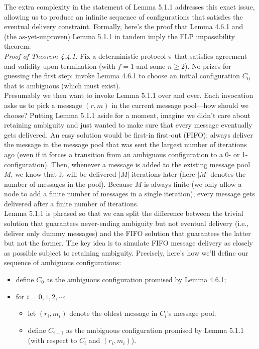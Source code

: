 The extra complexity in the statement of Lemma 5.1.1 addresses this exact issue, allowing
us to produce an infinite sequence of configurations that satisfies the eventual delivery constraint. Formally, here’s the proof that Lemma 4.6.1 and (the as-yet-unproven) Lemma 5.1.1 in tandem imply the FLP impossibility theorem:\\
\noindent
\textit{Proof of Theorem 4.4.1:} Fix a deterministic protocol $\pi$ that satisfies agreement and validity
upon termination (with $f = 1$ and some $n \geq 2$). No prizes for guessing the first step: invoke
Lemma 4.6.1 to choose an initial configuration $C_0$ that is ambiguous (which must exist).\\
Presumably we then want to invoke Lemma 5.1.1 over and over. Each invocation asks
us to pick a message $(r, m)$ in the current message pool—how should we choose? Putting
Lemma 5.1.1 aside for a moment, imagine we didn't care about retaining ambiguity and
just wanted to make sure that every message eventually gets delivered. An easy solution
would be first-in first-out (FIFO): always deliver the message in the message pool that was
sent the largest number of iterations ago (even if it forces a transition from an ambiguous
configuration to a 0- or 1-configuration). Then, whenever a message is added to the existing
message pool $M$, we know that it will be delivered $|M|$ iterations later (here $|M|$ denotes
the number of messages in the pool). Because $M$ is always finite (we only allow a node to
add a finite number of messages in a single iteration), every message gets delivered after a
finite number of iterations.\\
Lemma 5.1.1 is phrased so that we can split the difference between the trivial solution
that guarantees never-ending ambiguity but not eventual delivery (i.e., deliver only dummy
messages) and the FIFO solution that guarantees the latter but not the former. The key idea
is to simulate FIFO message delivery as closely as possible subject to retaining ambiguity.
Precisely, here’s how we’ll define our sequence of ambiguous configurations:
\begin{itemize}
    \item define $C_0$ as the ambiguous configuration promised by Lemma 4.6.1;
    \item for $i = 0, 1, 2, \cdots$:
    \begin{itemize}
        \item let $(r_i, m_i)$ denote the oldest message in $C_i$’s message pool;
        \item define $C_{i+1}$ as the ambiguous configuration promised by Lemma 5.1.1 (with respect to $C_i$ and $(r_i, m_i)$).
    \end{itemize}
\end{itemize}

